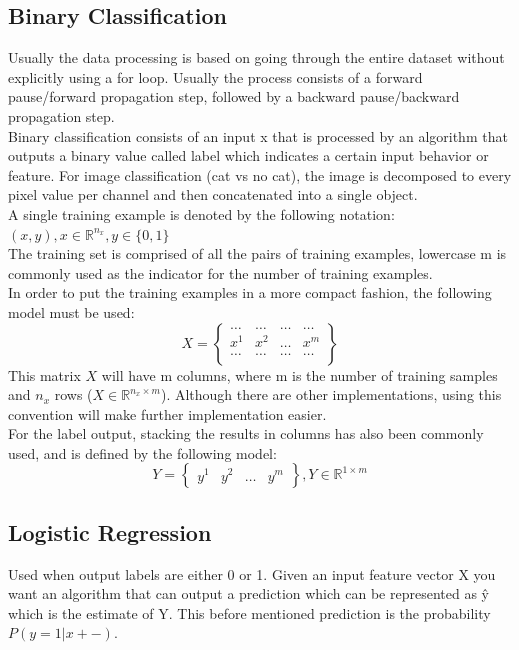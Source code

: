 \documentclass[11pt]{report}
\begin{document}
\subsection*{Binary Classification}
Usually the data processing is based on going through the entire dataset without explicitly using a for loop. Usually the process consists of a forward pause/forward propagation step, followed by a backward pause/backward propagation step.\\
Binary classification consists of an input x that is processed by an algorithm that outputs a binary value called label which indicates a certain input behavior or feature. For image classification (cat vs no cat), the image is decomposed to every pixel value per channel and then concatenated into a single object. \\
A single training example is denoted by the following notation:\\
$(x,y), x \in \mathbb{R}^{n_x}, y \in \{0,1\}$\\
The training set is comprised of all the pairs of training examples, lowercase m is commonly used as the indicator for the number of training examples.\\
In order to put the training examples in a more compact fashion, the following model must be used:
\begin{equation}
	X =
	\begin{Bmatrix} 
	\dots & \dots & \dots & \dots\\
	x^1 & x^2 & \dots & x^m \\
	\dots & \dots & \dots & \dots\\
	\end{Bmatrix} 
 \end{equation}
This matrix $X$ will have m columns, where m is the number of training samples and $n_x$ rows ($X \in \mathbb{R}^{n_x \times m}$). Although there are other implementations, using this convention will make further implementation easier.\\
For the label output, stacking the results in columns has also been commonly used, and is defined by the following model:
\begin{equation}
	Y =
	\begin{Bmatrix} 
	y^1 & y^2 & \dots & y^m
	\end{Bmatrix}
	, Y \in \mathbb{R}^{1 \times m} 
 \end{equation}

\subsection*{Logistic Regression}
Used when output labels are either 0 or 1. Given an input feature vector X you want an algorithm that can output a prediction which can be represented as \^y which is the estimate of Y. This before mentioned prediction is the probability $P(y=1 | x+
-)$.
\end{document}
